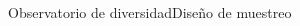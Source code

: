 \documentclass[aspectratio=169, 10pt]{beamer}
\begin{document}
\begin{frame}{Observatorio de diversidad}{Diseño de muestreo}
\begin{columns}
\begin{column}{0.5\textwidth}
\end{column}
\end{columns}
\end{frame}

\end{document}
